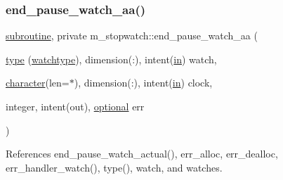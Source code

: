 \subsubsection{\texorpdfstring{end\+\_\+pause\+\_\+watch\+\_\+aa()}{end\_pause\_watch\_aa()}}
{\footnotesize\ttfamily \hyperlink{M__stopwatch_83_8txt_acfbcff50169d691ff02d4a123ed70482}{subroutine}, private m\+\_\+stopwatch\+::end\+\_\+pause\+\_\+watch\+\_\+aa (\begin{DoxyParamCaption}\item[{\hyperlink{stop__watch_83_8txt_a70f0ead91c32e25323c03265aa302c1c}{type} (\hyperlink{structm__stopwatch_1_1watchtype}{watchtype}), dimension(\+:), intent(\hyperlink{M__journal_83_8txt_afce72651d1eed785a2132bee863b2f38}{in})}]{watch,  }\item[{\hyperlink{option__stopwatch_83_8txt_abd4b21fbbd175834027b5224bfe97e66}{character}(len=$\ast$), dimension(\+:), intent(\hyperlink{M__journal_83_8txt_afce72651d1eed785a2132bee863b2f38}{in})}]{clock,  }\item[{integer, intent(out), \hyperlink{option__stopwatch_83_8txt_aa4ece75e7acf58a4843f70fe18c3ade5}{optional}}]{err }\end{DoxyParamCaption})\hspace{0.3cm}{\ttfamily [private]}}



References end\+\_\+pause\+\_\+watch\+\_\+actual(), err\+\_\+alloc, err\+\_\+dealloc, err\+\_\+handler\+\_\+watch(), type(), watch, and watches.

